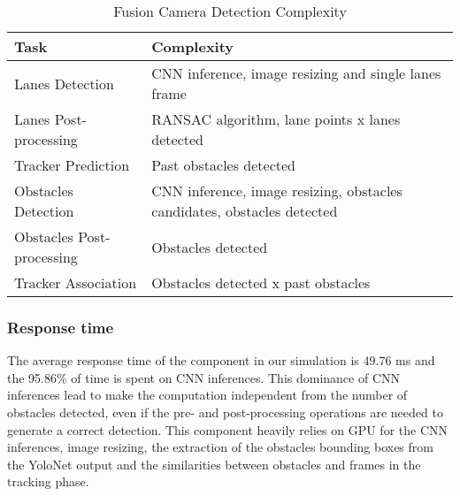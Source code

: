 \documentclass[conference]{IEEEtran}
\begin{document}
\begin{table}[htbp]
    \begin{center}
    \begin{adjustbox}{max width=\columnwidth}
        \setlength{\tabcolsep}{0.5em}
        \renewcommand{\arraystretch}{1.2}
        \begin{tabular}{|p{3cm}|p{6cm}|}
            \hline
            \textbf{Task} & \textbf{Complexity} \\
            \hline
            Lanes Detection & CNN inference, image resizing and single lanes frame\\
            \hline
            Lanes Post-processing & RANSAC algorithm, lane points x lanes detected \\
            \hline
            Tracker Prediction & Past obstacles detected\\
            \hline
            Obstacles Detection & CNN inference, image resizing, obstacles candidates, obstacles detected\\
            \hline
            Obstacles Post-processing & Obstacles detected\\
            \hline
            Tracker Association & Obstacles detected x past obstacles\\
            \hline
            \end{tabular}    
    \end{adjustbox}
    \label{fusion_detection_component_complexity_table}
    \end{center}
    \caption{Fusion Camera Detection Complexity}
\end{table}

\subsubsection*{Response time}

The average response time of the component in our simulation is 49.76 ms and the 95.86\% of time is spent on CNN inferences.
This dominance of CNN inferences lead to make the computation independent from the number of obstacles detected, even if the pre- and post-processing operations are needed to generate a correct detection.
This component heavily relies on GPU for the CNN inferences, image resizing, the extraction of the obstacles bounding boxes from the YoloNet output and the similarities between obstacles and frames in the tracking phase.
\end{document}
